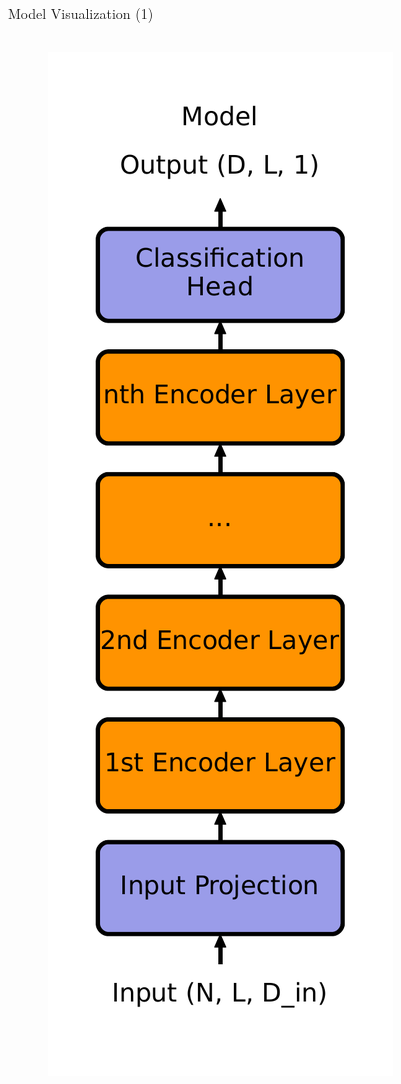 \documentclass[10pt]{beamer}
\begin{document}

\begin{frame}[fragile]{Model Visualization (1)}
\begin{columns}
\begin{column}{0.3\textwidth}
\begin{figure}
    \centering
    \includegraphics[height=\textheight]{figures/model/model.pdf}
\end{figure}    
\end{column}


\end{columns}
\end{frame}
\end{document}
